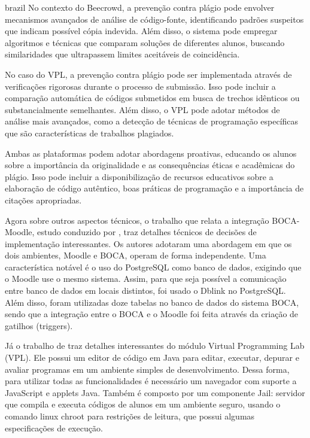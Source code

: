 \begin{otherlanguage*}{brazil}
No contexto do Beecrowd, a prevenção contra plágio pode envolver mecanismos avançados de análise de código-fonte, identificando padrões suspeitos que indicam possível cópia indevida. Além disso, o sistema pode empregar algoritmos e técnicas que comparam soluções de diferentes alunos, buscando similaridades que ultrapassem limites aceitáveis de coincidência.

No caso do VPL, a prevenção contra plágio pode ser implementada através de verificações rigorosas durante o processo de submissão. Isso pode incluir a comparação automática de códigos submetidos em busca de trechos idênticos ou substancialmente semelhantes. Além disso, o VPL pode adotar métodos de análise mais avançados, como a detecção de técnicas de programação específicas que são características de trabalhos plagiados.

Ambas as plataformas podem adotar abordagens proativas, educando os alunos sobre a importância da originalidade e as consequências éticas e acadêmicas do plágio. Isso pode incluir a disponibilização de recursos educativos sobre a elaboração de código autêntico, boas práticas de programação e a importância de citações apropriadas.

Agora sobre outros aspectos técnicos, o trabalho que relata a integração BOCA-Moodle, estudo conduzido por \cite{galasso}, traz detalhes técnicos de decisões de implementação interessantes. Os autores adotaram uma abordagem em que os dois ambientes, Moodle e BOCA, operam de forma independente. Uma característica notável é o uso do PostgreSQL como banco de dados, exigindo que o Moodle use o mesmo sistema. Assim, para que seja possível a comunicação entre banco de dados em locais distintos, foi usado o Dblink no PostgreSQL. Além disso, foram utilizadas doze tabelas no banco de dados do sistema BOCA, sendo que a integração entre o BOCA e o Moodle foi feita através da criação de gatilhos (triggers). 

Já o trabalho de \textcite{rodriguezdelpinoandroyo} traz detalhes interessantes do módulo Virtual Programming Lab (VPL). Ele possui um editor de código em Java para editar, executar, depurar e avaliar programas em um ambiente simples de desenvolvimento. Dessa forma, para utilizar todas as funcionalidades é necessário um navegador com suporte a JavaScript e applets Java. Também é composto por um componente Jail: servidor que compila e executa códigos de alunos em um ambiente seguro, usando o comando linux chroot para restrições de leitura, que possui algumas especificações de execução. 

\end{otherlanguage*}